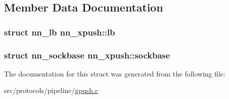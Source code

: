 \subsection{Member Data Documentation}
\subsubsection[{lb}]{\setlength{\rightskip}{0pt plus 5cm}struct {\bf nn\+\_\+lb} nn\+\_\+xpush\+::lb}\hypertarget{structnn__xpush_a1fafce229b653ae12781c4b716f17ed6}{}\label{structnn__xpush_a1fafce229b653ae12781c4b716f17ed6}
\subsubsection[{sockbase}]{\setlength{\rightskip}{0pt plus 5cm}struct {\bf nn\+\_\+sockbase} nn\+\_\+xpush\+::sockbase}\hypertarget{structnn__xpush_a96831cbdff702af2735b7cb6b6ce9638}{}\label{structnn__xpush_a96831cbdff702af2735b7cb6b6ce9638}


The documentation for this struct was generated from the following file\+:\begin{DoxyCompactItemize}
\item 
src/protocols/pipeline/\hyperlink{xpush_8c}{xpush.\+c}\end{DoxyCompactItemize}
